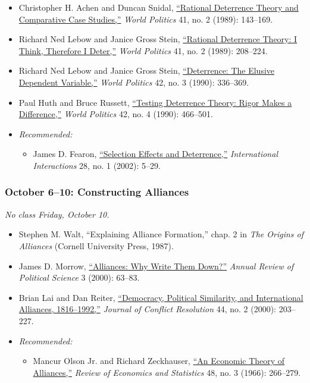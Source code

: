 \begin{itemize}
\item
  Christopher H. Achen and Duncan Snidal,
  \href{http://www.jstor.org/stable/2010405}{``Rational Deterrence
  Theory and Comparative Case Studies,''} \emph{World Politics} 41, no.
  2 (1989): 143--169.
\item
  Richard Ned Lebow and Janice Gross Stein,
  \href{http://www.jstor.org/stable/2010408}{``Rational Deterrence
  Theory: I Think, Therefore I Deter,''} \emph{World Politics} 41, no. 2
  (1989): 208--224.
\item
  Richard Ned Lebow and Janice Gross Stein,
  \href{http://www.jstor.org/stable/2010415}{``Deterrence: The Elusive
  Dependent Variable,''} \emph{World Politics} 42, no. 3 (1990):
  336--369.
\item
  Paul Huth and Bruce Russett,
  \href{http://www.jstor.org/stable/2010511}{``Testing Deterrence
  Theory: Rigor Makes a Difference,''} \emph{World Politics} 42, no. 4
  (1990): 466--501.
\item
  \emph{Recommended:}

  \begin{itemize}
  \itemsep1pt\parskip0pt
  \item
    James D. Fearon,
    \href{http://www.tandfonline.com/doi/abs/10.1080/03050620210390}{``Selection
    Effects and Deterrence,''} \emph{International Interactions} 28, no.
    1 (2002): 5--29.
  \end{itemize}
\end{itemize}

\subsubsection{October 6--10: Constructing
Alliances}\label{october-610-constructing-alliances}

\emph{No class Friday, October 10.}

\begin{itemize}
\item
  Stephen M. Walt, ``Explaining Alliance Formation,'' chap. 2 in
  \emph{The Origins of Alliances} (Cornell University Press, 1987).
\item
  James D. Morrow,
  \href{http://www.annualreviews.org/doi/abs/10.1146/annurev.polisci.3.1.63}{``Alliances:
  Why Write Them Down?''} \emph{Annual Review of Political Science} 3
  (2000): 63--83.
\item
  Brian Lai and Dan Reiter,
  \href{http://www.jstor.org/stable/174663}{``Democracy, Political
  Similarity, and International Alliances, 1816--1992,''} \emph{Journal
  of Conflict Resolution} 44, no. 2 (2000): 203--227.
\item
  \emph{Recommended:}

  \begin{itemize}
  \itemsep1pt\parskip0pt
  \item
    Mancur Olson Jr. and Richard Zeckhauser,
    \href{http://www.jstor.org/stable/1927082}{``An Economic Theory of
    Alliances,''} \emph{Review of Economics and Statistics} 48, no. 3
    (1966): 266--279.
  \end{itemize}
\end{itemize}

